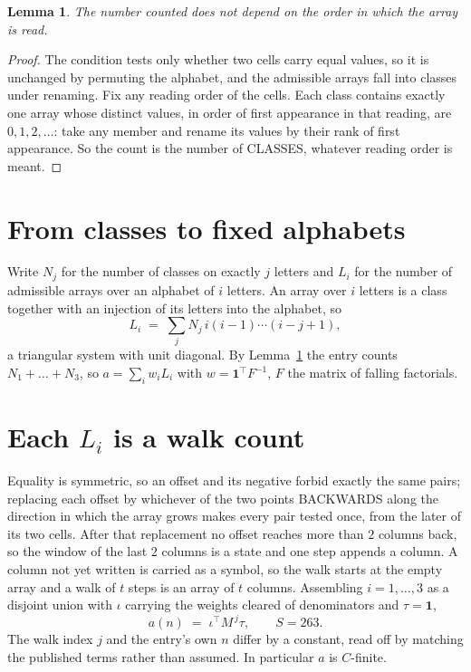\documentclass[11pt,a4paper]{article}
\theoremstyle{plain}
\newtheorem{lemma}[theorem]{Lemma}
\theoremstyle{definition}
\begin{document}
\begin{lemma}\label{lem:order}
The number counted does not depend on the order in which the array is read.
\end{lemma}

\begin{proof}
The condition tests only whether two cells carry equal values, so it is unchanged by permuting
the alphabet, and the admissible arrays fall into classes under renaming. Fix any reading order
of the cells. Each class contains exactly one array whose distinct values, in order of first
appearance in that reading, are $0,1,2,\dots$: take any member and rename its values by their
rank of first appearance. So the count is the number of CLASSES, whatever reading order is
meant.
\end{proof}

\section{From classes to fixed alphabets}

Write $N_j$ for the number of classes on exactly $j$ letters and $L_i$ for the number of
admissible arrays over an alphabet of $i$ letters. An array over $i$ letters is a class together
with an injection of its letters into the alphabet, so
\[
L_i\;=\;\sum_j N_j\,i(i-1)\cdots(i-j+1),
\]
a triangular system with unit diagonal. By Lemma~\ref{lem:order} the entry counts
$N_1+\dots+N_{3}$, so $a=\sum_i w_iL_i$ with $w=\mathbf{1}^{\!\top}F^{-1}$, $F$ the
matrix of falling factorials.

\section{Each $L_i$ is a walk count}

Equality is symmetric, so an offset and its negative forbid exactly the same pairs; replacing
each offset by whichever of the two points BACKWARDS along the direction in which the array
grows makes every pair tested once, from the later of its two cells. After that replacement no
offset reaches more than $2$ columns back, so the window of the last $2$
columns is a state and one step appends a column. A column not yet written is
carried as a symbol, so the walk starts at the empty array and a walk of $t$ steps is an array
of $t$ columns. Assembling $i=1,\dots,3$ as a disjoint union with $\iota$ carrying the
weights cleared of denominators and $\tau=\mathbf{1}$,
\[
a(n)\;=\;\iota^{\!\top}M^{\,j}\tau ,\qquad S=263.
\]
The walk index $j$ and the entry's own $n$ differ by a constant, read off by matching the
published terms rather than assumed. In particular $a$ is $C$-finite.
\end{document}
